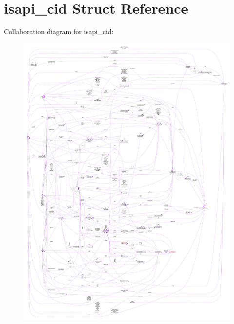 \hypertarget{structisapi__cid}{}\section{isapi\+\_\+cid Struct Reference}
\label{structisapi__cid}


Collaboration diagram for isapi\+\_\+cid\+:
\nopagebreak
\begin{figure}[H]
\begin{center}
\leavevmode
\includegraphics[width=350pt]{structisapi__cid__coll__graph}
\end{center}
\end{figure}
